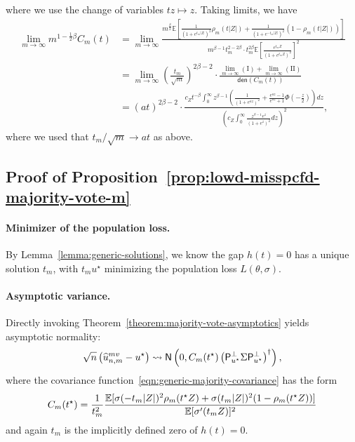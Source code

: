 \documentclass[11pt]{article}
\newcommand{\Ep}{\mathbb{E}}
\newcommand{\E}{\mathbb{E}}
\newcommand{\prn}[1]{\left({#1}\right)} %
\newcommand{\what}[1]{\widehat{#1}}
\newcommand{\normal}{\mathsf{N}}
\newcommand{\mv}{^{\textup{mv}}}
\newcommand{\proj}{\mathsf{P}}
\newcommand{\projperp}{\proj_{u\opt}^\perp}
\newcommand{\<}{\langle} %
\renewcommand{\>}{\rangle}
\newcommand{\cd}{\rightsquigarrow}
\newcommand{\opt}{^\star}
\begin{document}
where we use the change of variables $tz \mapsto z$. Taking limits, we have
\begin{align*}
  \lim_{m\to \infty} m^{1 - \frac{1}{2} \beta} C_m(t)
  & = \lim_{m\to \infty}  \frac{m^{\frac \beta 2}
    \Ep[\frac{1}{(1 + e^{t_m|Z|})^2} \rho_m(t |Z|)
      + \frac{1}{(1 + e^{-t_m|Z|})^2}(1-\rho_m(t|Z|))]}{
    m^{\beta - 1} t_m^{2 - 2 \beta} \cdot t_m^{2 \beta} \Ep[\frac{e^{t_m Z} }{ (1 + e^{t_m Z})^2}]^2} \\
  & = \lim_{m \to \infty}
  \left(\frac{t_m}{\sqrt{m}}\right)^{2 \beta - 2}
  \cdot \frac{\lim_{m\to \infty}\mathrm{(I)} + \lim_{m\to \infty}\mathrm{(II)}}{\mathsf{den}(C_m(t))} \\
  & =
  (at)^{2 \beta - 2}
  \cdot \frac{c_Z {t}^{-\beta} \int_0^\infty z^{\beta - 1}\left(\frac{1}{\left(1 + e^{a z}\right)^2} + \frac{e^{a z} - 1}{e^{a z} + 1} \Phi \left(-\frac{z}{2}\right)\right) dz}{  (c_Z\int_{0}^\infty \frac{z^{\beta - 1} e^{z} }{ (1 + e^{z})^2} dz)^2},
\end{align*}
where we used that $t_m/\sqrt{m} \to at$ as above. 


\subsection{Proof of Proposition~\ref{prop:lowd-misspcfd-majority-vote-m}}  \label{proof:lowd-misspcfd-majority-vote-m}

\paragraph{Minimizer of the population loss.} 
By Lemma~\ref{lemma:generic-solutions}, we know the gap $h(t)=0$ has a
unique solution $t_m$, with $t_m u\opt$ minimizing the population loss
$L(\theta, \sigma)$.

\paragraph{Asymptotic variance.} 
Directly invoking Theorem~\ref{theorem:majority-vote-asymptotics} yields
asymptotic normality:
\begin{equation*}
  \sqrt{n}\left(\what{u}\mv_{n,m} - u\opt\right)
  \cd \normal\prn{0, \varfunc(t\opt) \prn{\projperp \Sigma \projperp}^\dagger},
\end{equation*}
where the covariance function~\eqref{eqn:generic-majority-covariance} has the
form
\begin{equation}
  \varfunc(t\opt) = \frac{1}{t_m^2} \frac{\E[\sigma(-t_m |Z|)^2
      \rho_m(t\opt Z) + \sigma(t_m |Z|)^2 (1 - \rho_m(t\opt Z))]}{
    \E[\sigma'(t_m Z)]^2} \label{eqn:mis-majority-covariance}
\end{equation}
and again $t_m$ is the implicitly defined zero of $h(t) = 0$.
\end{document}
